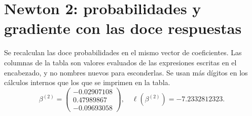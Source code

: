 \documentclass[11pt,a4paper]{article}
\begin{document}
\clearpage
\section{Newton 2: probabilidades y gradiente con las doce respuestas}\label{logit100}
Se recalculan las doce probabilidades en el mismo vector
de coeficientes. Las columnas de la tabla son valores evaluados
de las expresiones escritas en el encabezado, y no nombres nuevos
para esconderlas. Se usan más dígitos en los cálculos internos
que los que se imprimen en la tabla.
\[
\beta^{(2)}=\begin{pmatrix}-0.02907108\\0.47989867\\-0.09693058\end{pmatrix},\quad \ell(\beta^{(2)})=-7.2332812323.
\]
\end{document}
